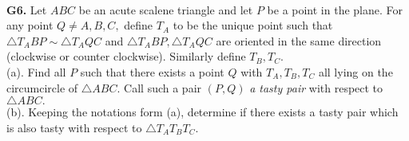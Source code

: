 \documentclass[12pt,a4paper]{article}
\begin{document}
\\
\textbf{G6.} Let \(ABC\) be an acute scalene triangle and let \(P\) be a point in the plane. For any point \(Q \ne A, B, C,\) define \(T_A\) to be the unique point such that \(\bigtriangleup {T_A}BP \sim \bigtriangleup {T_A}QC\) and \(\bigtriangleup {T_A}BP, \bigtriangleup {T_A}QC\) are oriented in the same direction (clockwise or counter clockwise). Similarly define \({T_B}, {T_C}\).\\
(a). Find all \(P\) such that there exists a point \(Q\) with \({T_A}, {T_B}, {T_C}\) all lying on the circumcircle of \(\bigtriangleup ABC.\) Call such a pair \(\left( P, Q \right)\) \textit{a tasty pair} with respect to \(\bigtriangleup ABC.\)\\
(b). Keeping the notations form (a), determine if there exists a tasty pair which is also tasty with respect to \(\bigtriangleup {T_A}{T_B}{T_C}.\)\\
\\
\newpage
\end{document}
